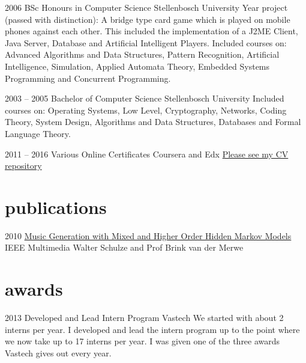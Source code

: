 \documentclass[print]{friggeri-cv-a4} %
\begin{document}
\begin{entrylist}

\entry
{2006}
{BSc Honours {\normalfont in Computer Science}}
{Stellenbosch University}
{Year project (passed with distinction): A bridge type card game which is played on mobile phones against each other. This included the implementation of a J2ME Client, Java Server, Database and Artificial Intelligent Players.
Included courses on: Advanced Algorithms and Data Structures, Pattern Recognition, Artificial Intelligence, Simulation, Applied Automata Theory, Embedded Systems Programming and Concurrent Programming.}

\entry
{2003 -- 2005}
{Bachelor {\normalfont of Computer Science}}
{Stellenbosch University}
{Included courses on: Operating Systems, Low Level, Cryptography, Networks, Coding Theory, System Design, Algorithms and Data Structures, Databases and Formal Language Theory.}

\entry
{2011 -- 2016}
{Various Online Certificates}
{Coursera and Edx}
{\href{https://github.com/awalterschulze/waltercv}{Please see my CV repository}}

\end{entrylist}

\section{publications}

\begin{entrylist}

\entry
{2010}
{\href{http://doi.ieeecomputersociety.org/10.1109/MMUL.2010.44}{Music Generation with Mixed and Higher Order Hidden Markov Models}}
{IEEE Multimedia}
{Walter Schulze and Prof Brink van der Merwe}

\end{entrylist}

\newpage

\section{awards}

\begin{entrylist}

\entry
{2013}
{Developed and Lead Intern Program}
{Vastech}
{We started with about 2 interns per year. I developed and lead the intern program up to the point where we now take up to 17 interns per year.  I was given one of the three awards Vastech gives out every year.}

\end{entrylist}
\end{document}
